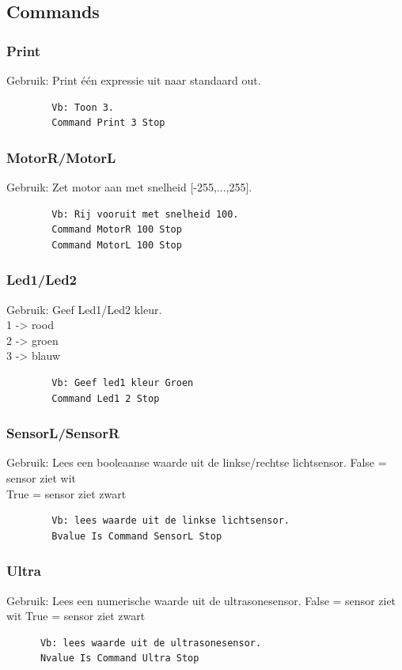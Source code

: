 \documentclass[a4paper,10pt]{article}
\begin{document}
  \subsection{Commands}
    \subsubsection{Print}
      Gebruik: Print één expressie uit naar standaard out.
      \begin{lstlisting}
        Vb: Toon 3.
        Command Print 3 Stop
      \end{lstlisting}
    \subsubsection{MotorR/MotorL}
      Gebruik: Zet motor aan met snelheid [-255,...,255].
      \begin{lstlisting}
        Vb: Rij vooruit met snelheid 100.
        Command MotorR 100 Stop
        Command MotorL 100 Stop
      \end{lstlisting}
    \subsubsection{Led1/Led2}
      Gebruik: Geef Led1/Led2 kleur.\\
      1 -> rood\\
      2 -> groen\\
      3 -> blauw\\
      \begin{lstlisting}
        Vb: Geef led1 kleur Groen
        Command Led1 2 Stop
      \end{lstlisting}
    \subsubsection{SensorL/SensorR}
      Gebruik: Lees een booleaanse waarde uit de linkse/rechtse lichtsensor.
      False = sensor ziet wit\\
      True  = sensor ziet zwart\\
      \begin{lstlisting}
        Vb: lees waarde uit de linkse lichtsensor.
        Bvalue Is Command SensorL Stop
      \end{lstlisting}
    \subsubsection{Ultra}
      Gebruik: Lees een numerische waarde uit de ultrasonesensor.
      False = sensor ziet wit
      True  = sensor ziet zwart
      \begin{lstlisting}
      Vb: lees waarde uit de ultrasonesensor.
      Nvalue Is Command Ultra Stop
      \end{lstlisting}
\end{document}
